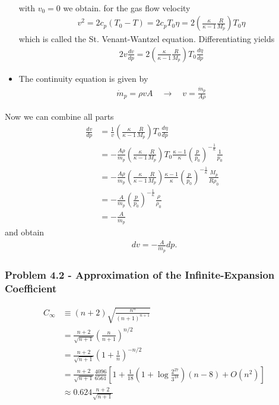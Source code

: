 \documentclass[10pt,a4paper]{book}
\theoremstyle{definition}
\begin{document}
\begin{itemize}
\begin{align}
\end{align}
with $v_0=0$ we obtain. for the gas flow velocity
\begin{align}
    v^2=2c_p(T_0-T)=2c_pT_0\eta=2\left(\frac{\kappa}{\kappa-1}\frac{R}{M_p}\right)T_0\eta
\end{align}
which is called the St. Venant-Wantzel equation. Differentiating yields
\begin{align}
2v\frac{dv}{dp}=2\left(\frac{\kappa}{\kappa-1}\frac{R}{M_p}\right)T_0\frac{d\eta}{dp}
\end{align}
\item The continuity equation is given by
\begin{align}
    \dot m_p=\rho vA\quad\rightarrow\quad v=\frac{\dot m_p}{A\rho}
\end{align}
\end{itemize}
Now we can combine all parts
\begin{align}
    \frac{dv}{dp}
    &=\frac{1}{v}\left(\frac{\kappa}{\kappa-1}\frac{R}{M_p}\right)T_0\frac{d\eta}{dp}\\
    &=-\frac{A\rho}{\dot m_p}\left(\frac{\kappa}{\kappa-1}\frac{R}{M_p}\right)T_0\frac{\kappa-1}{\kappa}\left(\frac{p}{p_0}\right)^{-\frac{1}{\kappa}}\frac{1}{p_0}\\
    &=-\frac{A\rho}{\dot m_p}\left(\frac{\kappa}{\kappa-1}\frac{R}{M_p}\right)\frac{\kappa-1}{\kappa}\left(\frac{p}{p_0}\right)^{-\frac{1}{\kappa}}\frac{M_p}{R\rho_0}\\
    &=-\frac{A}{\dot m_p}\left(\frac{p}{p_0}\right)^{-\frac{1}{\kappa}}\frac{\rho}{\rho_0}\\
    &=-\frac{A}{\dot m_p}
\end{align}
and obtain
\begin{align}
    dv=-\frac{A}{\dot m_p}dp.
\end{align}

\subsubsection{Problem 4.2 - Approximation of the Infinite-Expansion Coefficient}
\begin{align}
    C_\infty&\equiv(n+2)\sqrt{\frac{n^n}{(n+1)^{n+1}}}\\
    &=\frac{n+2}{\sqrt{n+1}}\left(\frac{n}{n+1}\right)^{n/2}\\
    &=\frac{n+2}{\sqrt{n+1}}\left(1+\frac{1}{n}\right)^{-n/2}\\
    &=\frac{n+2}{\sqrt{n+1}}\frac{4096}{6561}\left[1+\frac{1}{18}\left(1+\log\frac{2^{27}}{3^{18}}\right)(n-8) +O\left(n^2\right)\right]\\
    &\approx 0.624 \frac{n+2}{\sqrt{n+1}}
\end{align}
\end{document}

